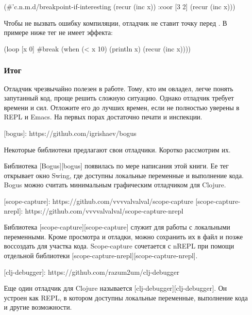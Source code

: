 \begin{english}
  \begin{clojure}
(#'c.n.m.d/breakpoint-if-interesting
 (recur (inc x))
 {:coor [3 2]}
 (recur (inc x)))
  \end{clojure}
\end{english}

Чтобы не вызвать ошибку компиляции, отладчик не ставит точку перед . В примере ниже тег  не имеет эффекта:

\begin{english}
  \begin{clojure}
(loop [x 0]
  #break
  (when (< x 10)
    (println x)
    (recur (inc x))))
  \end{clojure}
\end{english}

\subsubsection{Итог}

Отладчик чрезвычайно полезен в работе. Тому, кто им овладел, легче понять запутанный код, проще решить сложную ситуацию. Однако отладчик требует времени и сил. Отложите его до лучших времен, если не полностью уверены в REPL и Emacs. На первых порах достаточно печати и инспекции.

[bogus]: https://github.com/igrishaev/bogus

Некоторые библиотеки предлагают свои отладчики. Коротко рассмотрим их.

Библиотека [Bogus][bogus] появилась по мере написания этой книги. Ее тег  открывает окно Swing, где доступны локальные переменные и выполнение кода. Bogus можно считать минимальным графическим отладчиком для Clojure.

[scope-capture]: https://github.com/vvvvalvalval/scope-capture
[scope-capture-nrepl]: https://github.com/vvvvalvalval/scope-capture-nrepl

Библиотека [scope-capture][scope-capture] служит для работы с локальными переменными. Кроме просмотра и отладки, можно сохранить их в файл и позже воссоздать для участка кода. Scope-capture сочетается с nREPL при помощи отдельной библиотеки [scope-capture-nrepl][scope-capture-nrepl].

[clj-debugger]: https://github.com/razum2um/clj-debugger

Еще один отладчик для Clojure называется [clj-debugger][clj-debugger]. Он устроен как REPL, в котором доступны локальные переменные, выполнение кода и другие возможности.

